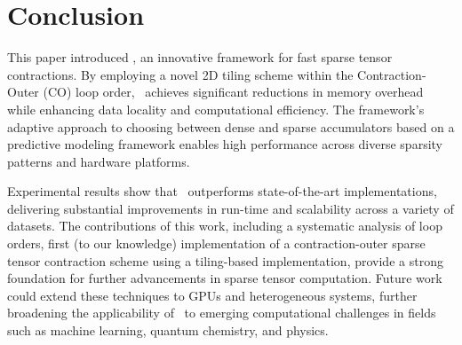 \section{Conclusion}
\label{sec:conc}

This paper introduced \ourtool, an innovative framework for fast sparse tensor contractions. By employing a novel 2D tiling scheme within the Contraction-Outer (CO) loop order, \ourtool\ achieves significant reductions in memory overhead while enhancing data locality and computational efficiency. The framework's adaptive approach to choosing between dense and sparse accumulators based on a predictive modeling framework enables high performance across diverse sparsity patterns and hardware platforms.

Experimental results show that \ourtool\ outperforms state-of-the-art implementations, delivering substantial improvements in run-time and scalability across a variety of datasets. The contributions of this work, including a systematic analysis of loop orders, first (to our knowledge) implementation of a contraction-outer sparse tensor contraction scheme using a tiling-based implementation, provide a strong foundation for further advancements in sparse tensor computation. Future work could extend these techniques to GPUs and heterogeneous systems, further broadening the applicability of \ourtool\ to emerging computational challenges in fields such as machine learning, quantum chemistry, and physics.

% 
% 